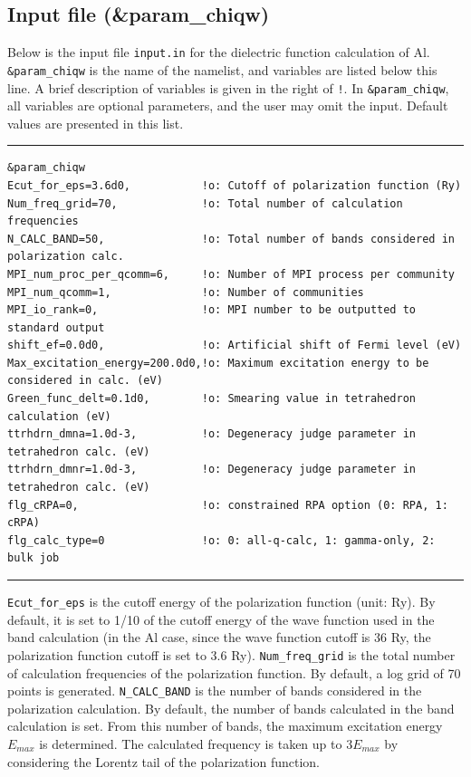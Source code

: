 \documentclass{article}
\begin{document}
\subsection{\label{input-chiqw}Input file (\&param\_chiqw)}
Below is the input file \verb+input.in+ for the dielectric function calculation of Al. \verb+&param_chiqw+ is the name of the namelist, and variables are listed below this line. A brief description of variables is given in the right of {\tt !}. In {\tt \&param\_chiqw}, all variables are optional parameters, and the user may omit the input. Default values are presented in this list. 
\vspace{5mm}\hrule
\begin{verbatim}
&param_chiqw 
Ecut_for_eps=3.6d0,           !o: Cutoff of polarization function (Ry)
Num_freq_grid=70,             !o: Total number of calculation frequencies
N_CALC_BAND=50,               !o: Total number of bands considered in polarization calc.
MPI_num_proc_per_qcomm=6,     !o: Number of MPI process per community
MPI_num_qcomm=1,              !o: Number of communities
MPI_io_rank=0,                !o: MPI number to be outputted to standard output
shift_ef=0.0d0,               !o: Artificial shift of Fermi level (eV)
Max_excitation_energy=200.0d0,!o: Maximum excitation energy to be considered in calc. (eV)
Green_func_delt=0.1d0,        !o: Smearing value in tetrahedron calculation (eV)
ttrhdrn_dmna=1.0d-3,          !o: Degeneracy judge parameter in tetrahedron calc. (eV)
ttrhdrn_dmnr=1.0d-3,          !o: Degeneracy judge parameter in tetrahedron calc. (eV)
flg_cRPA=0,                   !o: constrained RPA option (0: RPA, 1: cRPA)
flg_calc_type=0               !o: 0: all-q-calc, 1: gamma-only, 2: bulk job
\end{verbatim}
\hrule\vspace{5mm}

\verb+Ecut_for_eps+ is the cutoff energy of the polarization function (unit: Ry). By default, it is set to 1/10 of the cutoff energy of the wave function used in the band calculation (in the Al case, since the wave function cutoff is 36 Ry, the polarization function cutoff is set to 3.6 Ry). \verb+Num_freq_grid+ is the total number of calculation frequencies of the polarization function. By default, a log grid of 70 points is generated. \verb+N_CALC_BAND+ is the number of bands considered in the polarization calculation. By default, the number of bands calculated in the band calculation is set. From this number of bands, the maximum excitation energy $E_{max}$ is determined. The calculated frequency is taken up to $3E_{max}$ by considering the Lorentz tail of the polarization function. 
\end{document}

